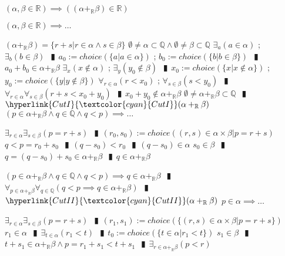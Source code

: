 \documentclass{book}
\newcommand{\wff}[1]{\hypertarget{#1}{\fbox{\textcolor{red}{$#1$}}\phantom{--}}}
\newcommand{\rf}[1]{\hyperlink{#1}{\textcolor{cyan}{#1}}}
\newcommand{\abr}{:=}
\newcommand{\pipe}{$\phantom{(}\vrectangleblack\phantom{)}$}
\newcommand{\pr}[1]{\left(#1\right)}
\begin{document}
\wff{FieldAdditionClosureOfR} $(\alpha, \beta \in \mathbb{R}) \implies \pr{(\alpha +_{\mathbb{R}} \beta) \in \mathbb{R}}$
\begin{enumerate}
  \lit $(\alpha, \beta \in \mathbb{R}) \implies \ldots$
  \begin{enumerate}
    \lit $(\alpha +_{\mathbb{R}} \beta) = \{r + s | r \in \alpha \land s \in \beta\}$
    \lit $\emptyset \neq \alpha \subset \mathbb{Q} \land \emptyset \neq \beta \subset \mathbb{Q}$
    \lit $\exists_{a}(a \in \alpha)$ ; $\exists_{b}(b \in \beta)$ \pipe $a_0 \abr choice(\{a | a \in \alpha\})$ ; $b_0 \abr choice(\{b | b \in \beta\})$ \pipe $a_0  + b_0 \in \alpha +_{\mathbb{R}} \beta$
    \lit $\exists_{x}(x \notin \alpha)$ ; $\exists_{y}(y_0 \notin \beta)$ \pipe $x_0 \abr choice(\{x | x \notin \alpha\})$ ; $y_0 \abr choice(\{y | y \notin \beta\})$
    \lit $\forall_{r \in \alpha}(r < x_0)$ ; $\forall_{s \in \beta}(s < y_0)$ \pipe $\forall_{r \in \alpha} \forall_{s \in \beta}(r + s < x_0 + y_0)$ \pipe $x_0 + y_0 \not \in \alpha +_{\mathbb{R}} \beta$
    \lit $\emptyset \neq \alpha +_{\mathbb{R}} \beta \subset \mathbb{Q}$ \pipe $\rf{CutI}(\alpha +_{\mathbb{R}} \beta)$
    \lit $(p \in \alpha +_{\mathbb{R}} \beta \land q \in \mathbb{Q} \land q < p) \implies \ldots$
    \begin{enumerate}
      \lit $\exists_{r \in \alpha} \exists_{s \in \beta}(p = r + s)$ \pipe $(r_0, s_0) \abr choice({(r, s) \in \alpha \times \beta | p = r + s})$
      \lit $q < p = r_0 + s_0$ \pipe $(q - s_0) < r_0$ \pipe $(q - s_0) \in \alpha$
      \lit $s_0 \in \beta$ \pipe $q = (q - s_0) + s_0 \in \alpha +_{\mathbb{R}} \beta$ \pipe $q \in \alpha +_{\mathbb{R}} \beta$
    \end{enumerate}
    \lit $(p \in \alpha +_{\mathbb{R}} \beta \land q \in \mathbb{Q} \land q < p) \implies q \in \alpha +_{\mathbb{R}} \beta$ \pipe $\forall_{p \in \alpha +_{\mathbb{R}} \beta} \forall_{q \in \mathbb{Q}}(q < p \implies q \in \alpha +_{\mathbb{R}} \beta)$ \pipe $\rf{CutII}(\alpha +_{\mathbb{R}} \beta)$
    \lit $p \in \alpha \implies \ldots$
    \begin{enumerate}
      \lit $\exists_{r \in \alpha} \exists_{s \in \beta}(p = r + s)$ \pipe $(r_1, s_1) \abr choice(\{(r, s) \in \alpha \times \beta | p = r + s\})$
      \lit $r_1 \in \alpha$ \pipe $\exists_{t \in \alpha}(r_1 < t)$ \pipe $t_0 \abr choice(\{t \in \alpha | r_1 < t\})$
      \lit $s_1 \in \beta$ \pipe $t + s_1 \in \alpha +_{\mathbb{R}} \beta \land p = r_1 + s_1 < t + s_1$ \pipe $\exists_{r \in \alpha +_{\mathbb{R}} \beta}(p < r)$
    \end{enumerate}

\end{enumerate}
\end{enumerate}
\end{document}
